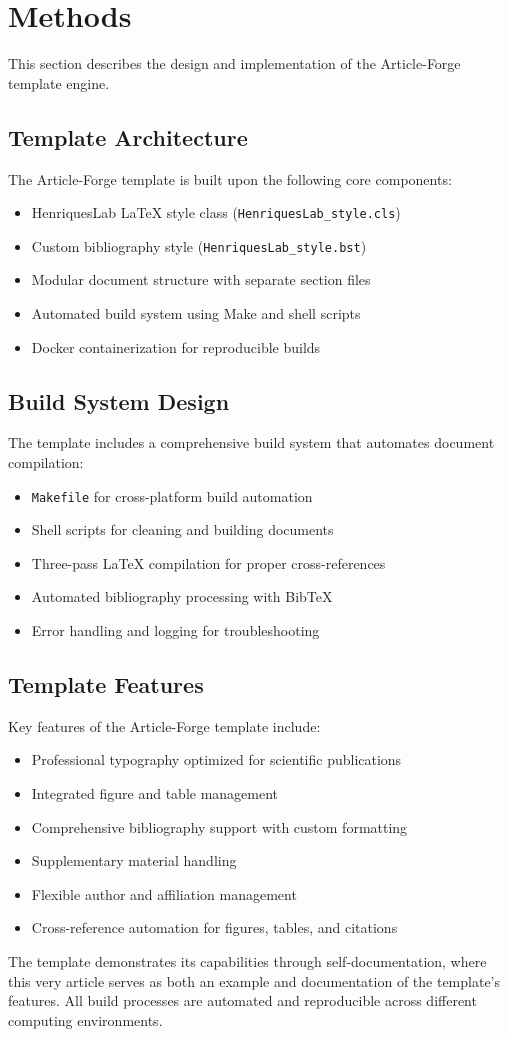 \section{Methods}

This section describes the design and implementation of the Article-Forge template engine.

\subsection{Template Architecture}

The Article-Forge template is built upon the following core components:
\begin{itemize}
    \item HenriquesLab LaTeX style class (\texttt{HenriquesLab\_style.cls})
    \item Custom bibliography style (\texttt{HenriquesLab\_style.bst})
    \item Modular document structure with separate section files
    \item Automated build system using Make and shell scripts
    \item Docker containerization for reproducible builds
\end{itemize}

\subsection{Build System Design}

The template includes a comprehensive build system that automates document compilation:
\begin{itemize}
    \item \texttt{Makefile} for cross-platform build automation
    \item Shell scripts for cleaning and building documents
    \item Three-pass LaTeX compilation for proper cross-references
    \item Automated bibliography processing with BibTeX
    \item Error handling and logging for troubleshooting
\end{itemize}

\subsection{Template Features}

Key features of the Article-Forge template include:
\begin{itemize}
    \item Professional typography optimized for scientific publications
    \item Integrated figure and table management
    \item Comprehensive bibliography support with custom formatting
    \item Supplementary material handling
    \item Flexible author and affiliation management
    \item Cross-reference automation for figures, tables, and citations
\end{itemize}

The template demonstrates its capabilities through self-documentation, where this very article serves as both an example and documentation of the template's features. All build processes are automated and reproducible across different computing environments.
